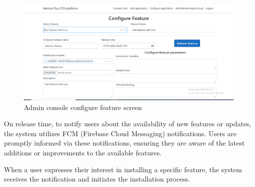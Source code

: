 \documentclass[
12pt,
oneside, 
onehalfspacing, 
nolistspacing, 
parskip, 
chapterinoneline, 
]{AASTCOMPUTER}
\begin{document}
 \begin{figure}[!ht]
	\centering
	\includegraphics[scale=0.4]{Figures/FrontEnd/AdminConsole/configure.PNG}
  	\caption{Admin console configure feature screen}
  	\label{fig:Admin console configure feature screen}
\end{figure}

On release time, to notify users about the availability of new features or updates, the system utilizes FCM (Firebase Cloud Messaging) notifications. Users are promptly informed via these notifications, ensuring they are aware of the latest additions or improvements to the available features.

When a user expresses their interest in installing a specific feature, the system receives the notification and initiates the installation process.
\end{document}
